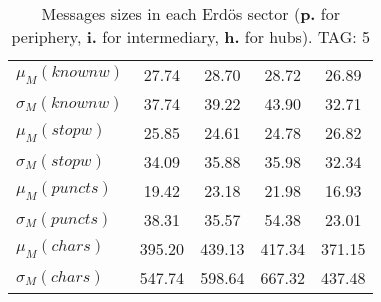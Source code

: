 \begin{table}[h!]
\begin{center}
\begin{tabular}{| l || c | c | c | c |}
$\mu_M(knownw)$ & 27.74  & 28.70  & 28.72  & 26.89 \\
$\sigma_M(knownw)$ & 37.74  & 39.22  & 43.90  & 32.71 \\\hline
$\mu_M(stopw)$ & 25.85  & 24.61  & 24.78  & 26.82 \\
$\sigma_M(stopw)$ & 34.09  & 35.88  & 35.98  & 32.34 \\\hline
$\mu_M(puncts)$ & 19.42  & 23.18  & 21.98  & 16.93 \\
$\sigma_M(puncts)$ & 38.31  & 35.57  & 54.38  & 23.01 \\\hline
$\mu_M(chars)$ & 395.20  & 439.13  & 417.34  & 371.15 \\
$\sigma_M(chars)$ & 547.74  & 598.64  & 667.32  & 437.48 \\\hline
\end{tabular}
\caption{Messages sizes in each Erd\"os sector ({{\bf p.}} for periphery, {{\bf i.}} for intermediary, {{\bf h.}} for hubs). TAG: 5}
\end{center}
\end{table}